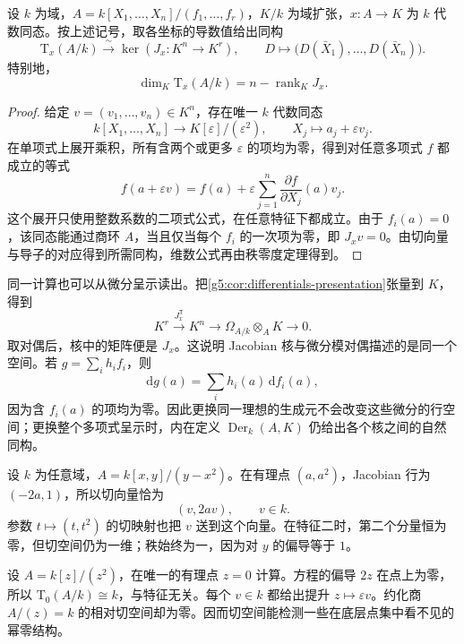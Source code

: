 \begin{theorem}\label{g5:thm:jacobian-tangent-space}
	设 \(k\) 为域，\(A=k[X_1,\ldots,X_n]/(f_1,\ldots,f_r)\)，\(K/k\) 为域扩张，\(x:A\to K\) 为 \(k\) 代数同态。按上述记号，取各坐标的导数值给出同构
	\[
		\mathrm{T}_x(A/k)\xrightarrow{\ \sim\ }
		\ker(J_x:K^n\to K^r),\qquad
		D\longmapsto\bigl(D(\bar X_1),\ldots,D(\bar X_n)\bigr).
	\]
	特别地，
	\[
		\dim_K \mathrm{T}_x(A/k)=n-\operatorname{rank}_K J_x.
	\]
\end{theorem}
\begin{proof}
	给定 \(v=(v_1,\ldots,v_n)\in K^n\)，存在唯一 \(k\) 代数同态
	\[
		k[X_1,\ldots,X_n]\longrightarrow K[\varepsilon]/(\varepsilon^2),
		\qquad X_j\longmapsto a_j+\varepsilon v_j.
	\]
	在单项式上展开乘积，所有含两个或更多 \(\varepsilon\) 的项均为零，得到对任意多项式 \(f\) 都成立的等式
	\[
		f(a+\varepsilon v)
		=f(a)+\varepsilon\sum_{j=1}^n
		\frac{\partial f}{\partial X_j}(a)v_j.
	\]
	这个展开只使用整数系数的二项式公式，在任意特征下都成立。由于 \(f_i(a)=0\)，该同态能通过商环 \(A\)，当且仅当每个 \(f_i\) 的一次项为零，即 \(J_xv=0\)。由切向量与导子的对应得到所需同构，维数公式再由秩零度定理得到。
\end{proof}

同一计算也可以从微分呈示读出。把\cref{g5:cor:differentials-presentation}张量到 \(K\)，得到
\[
	K^r\xrightarrow{J_x^{\mathsf T}}K^n
	\longrightarrow\Omega_{A/k}\otimes_AK\longrightarrow0.
\]
取对偶后，核中的矩阵便是 \(J_x\)。这说明 Jacobian 核与微分模对偶描述的是同一个空间。若 \(g=\sum_i h_if_i\)，则
\[
	\mathrm{d}g(a)=\sum_i h_i(a)\,\mathrm{d}f_i(a),
\]
因为含 \(f_i(a)\) 的项均为零。因此更换同一理想的生成元不会改变这些微分的行空间；更换整个多项式呈示时，内在定义 \(\operatorname{Der}_k(A,K)\) 仍给出各个核之间的自然同构。

\begin{example}\label{g5:exm:parabola-tangent}
	设 \(k\) 为任意域，\(A=k[x,y]/(y-x^2)\)。在有理点 \((a,a^2)\)，Jacobian 行为 \((-2a,1)\)，所以切向量恰为
	\[
		(v,2av),\qquad v\in k.
	\]
	参数 \(t\mapsto(t,t^2)\) 的切映射也把 \(v\) 送到这个向量。在特征二时，第二个分量恒为零，但切空间仍为一维；秩始终为一，因为对 \(y\) 的偏导等于 \(1\)。
\end{example}

\begin{example}\label{g5:exm:double-point-tangent}
	设 \(A=k[z]/(z^2)\)，在唯一的有理点 \(z=0\) 计算。方程的偏导 \(2z\) 在点上为零，所以 \(\mathrm{T}_0(A/k)\cong k\)，与特征无关。每个 \(v\in k\) 都给出提升 \(z\mapsto\varepsilon v\)。约化商 \(A/(z)=k\) 的相对切空间却为零。因而切空间能检测一些在底层点集中看不见的幂零结构。
\end{example}

